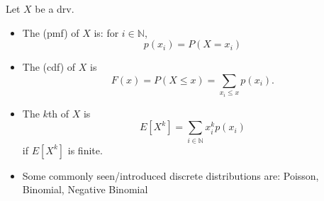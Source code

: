 \documentclass[notoc,notitlepage]{tufte-book}
\begin{document}
\begin{note}
  Let $X$ be a drv.
  \begin{itemize}
    \item The  (pmf) of $X$ is: for $i \in \mathbb{N}$,
      \begin{equation*}
        p(x_i) = P(X = x_i)
      \end{equation*}

    \item The  (cdf) of $X$ is
      \begin{equation*}
        F(x) = P(X \leq x) = \sum_{x_i \leq x} p(x_i).
      \end{equation*}

    \item The $k$th  of $X$ is
      \begin{equation*}
        E[X^k] = \sum_{i \in \mathbb{N}} x_i^k p(x_i)
      \end{equation*}
      if $E[X^k]$ is finite.

    \item Some commonly seen/introduced discrete distributions are: Poisson, Binomial, Negative Binomial
  \end{itemize}
\end{note}
\end{document}
